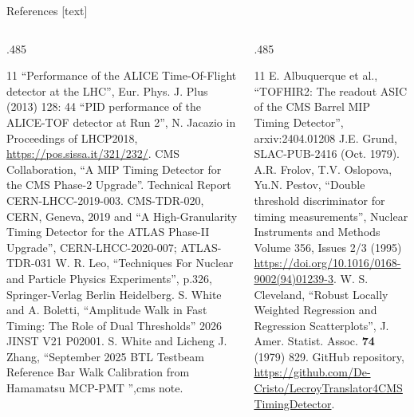 \begin{frame}[t]{References}
\fontsize{7}{8}\selectfont
\setlength{\parskip}{0pt}
[text]
\begin{columns}[T,onlytextwidth]
\begin{column}{.485\textwidth}
\begin{thebibliography}{11}
\setlength{\itemsep}{1pt}
\setlength{\parsep}{0pt}
``Performance of the ALICE Time-Of-Flight detector at the LHC'',
Eur. Phys. J. Plus (2013) 128: 44
``PID performance of the ALICE-TOF detector at Run 2'', N. Jacazio in
Proceedings of LHCP2018, \url{https://pos.sissa.it/321/232/}.
CMS Collaboration, ``A MIP Timing Detector for the CMS Phase-2 Upgrade''.
Technical Report CERN-LHCC-2019-003. CMS-TDR-020, CERN, Geneva, 2019 and
``A High-Granularity Timing Detector for the ATLAS Phase-II Upgrade'',
CERN-LHCC-2020-007; ATLAS-TDR-031
W. R. Leo, ``Techniques For Nuclear and Particle Physics Experiments'',
p.326, Springer-Verlag Berlin Heidelberg.
S. White and A. Boletti, ``Amplitude Walk in Fast Timing: The Role of Dual Thresholds''
2026 JINST V21 P02001.
S. White and Licheng J. Zhang, ``September 2025 BTL Testbeam Reference Bar Walk
Calibration from Hamamatsu MCP-PMT '',cms note.
\end{thebibliography}
\end{column}
\begin{column}{.485\textwidth}
\begin{thebibliography}{11}
\setlength{\itemsep}{1pt}
\setlength{\parsep}{0pt}
E. Albuquerque et al., ``TOFHIR2: The readout ASIC of the CMS Barrel MIP Timing
Detector'', arxiv:2404.01208
J.E. Grund, SLAC-PUB-2416 (Oct. 1979).
A.R. Frolov, T.V. Oslopova, Yu.N. Pestov, ``Double threshold discriminator for
timing measurements'', Nuclear Instruments and Methods Volume 356, Issues 2/3
(1995) \url{https://doi.org/10.1016/0168-9002(94)01239-3}.
W. S. Cleveland, ``Robust Locally Weighted Regression and Regression Scatterplots'',
J. Amer. Statist. Assoc. \textbf{74} (1979) 829.
GitHub repository,
\url{https://github.com/De-Cristo/LecroyTranslator4CMSTimingDetector}.
\end{thebibliography}
\end{column}
\end{columns}
\end{frame}
